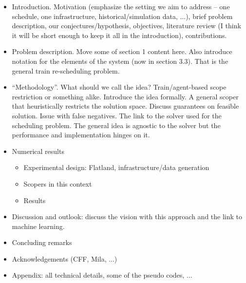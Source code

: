 \documentclass{article}
\begin{document}
\begin{itemize}
    \item Introduction. Motivation (emphasize the setting we aim to address -- one schedule, one infrastructure, historical/simulation data, ...), brief problem description, our conjectures/hypothesis, objectives, literature review (I think it will be short enough to keep it all in the introduction), contributions.
    \item Problem description. Move some of section 1 content here. Also introduce notation for the elements of the system (now in section 3.3). That is the general train re-scheduling problem.
    \item ``Methodology''. What should we call the idea? Train/agent-based scope restriction or something alike. Introduce the idea formally. A general scoper that heuristically restricts the solution space. Discuss guarantees on feasible solution. Issue with false negatives. The link to the solver used for the scheduling problem. The general idea is agnostic to the solver but the performance and implementation hinges on it.
    \item Numerical results
    \begin{itemize}
    \item Experimental design: Flatland, infrastructure/data generation
        \item Scopers in this context
        \item Results
    \end{itemize}
    \item Discussion and outlook: discuss the vision with this approach and the link to machine learning.
    \item Concluding remarks
    \item Acknowledgements (CFF, Mila, ...)
    \item Appendix: all technical details, some of the pseudo codes, ...
\end{itemize}



\end{document}
